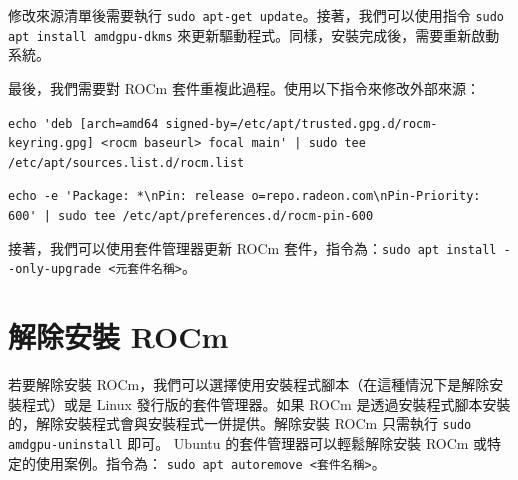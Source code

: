 修改來源清單後需要執行 \lstinline|sudo apt-get update|。接著，我們可以使用指令 \lstinline|sudo apt install amdgpu-dkms| 來更新驅動程式。同樣，安裝完成後，需要重新啟動系統。

最後，我們需要對 ROCm 套件重複此過程。使用以下指令來修改外部來源：

\lstinline!echo 'deb [arch=amd64 signed-by=/etc/apt/trusted.gpg.d/rocm-keyring.gpg] <rocm baseurl> focal main' | sudo tee /etc/apt/sources.list.d/rocm.list!

\lstinline!echo -e 'Package: *\nPin: release o=repo.radeon.com\nPin-Priority: 600' | sudo tee /etc/apt/preferences.d/rocm-pin-600!

接著，我們可以使用套件管理器更新 ROCm 套件，指令為：\lstinline|sudo apt install --only-upgrade <元套件名稱>|。

\section{解除安裝 ROCm}
若要解除安裝 ROCm，我們可以選擇使用安裝程式腳本（在這種情況下是解除安裝程式）或是 Linux 發行版的套件管理器。如果 ROCm 是透過安裝程式腳本安裝的，解除安裝程式會與安裝程式一併提供。解除安裝 ROCm 只需執行 \lstinline|sudo amdgpu-uninstall| 即可。
Ubuntu 的套件管理器可以輕鬆解除安裝 ROCm 或特定的使用案例。指令為：
\lstinline|sudo apt autoremove <套件名稱>|。


